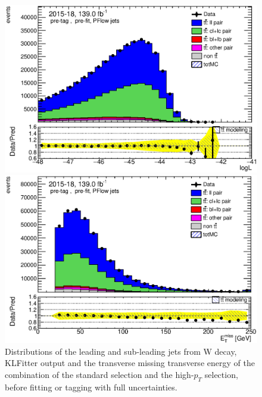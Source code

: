 \documentclass[letterpaper,12pt]{article}
\begin{document}
\begin{figure}[H]
\begin{minipage}[b]{.45\textwidth}
	\includegraphics[width=1\textwidth]{Oct_distributions/pretagNoRwDL1rwithhighpTPFlow_scaledall/DataMC_LLR.eps}
	\end{minipage}\hfill
	\begin{minipage}[b]{.45\textwidth}
	\centering
	\includegraphics[width=1\textwidth]{Oct_distributions/pretagNoRwDL1rwithhighpTPFlow_scaledall/DataMC_MET.eps}
	\end{minipage}
	\caption{Distributions of the leading and sub-leading jets from W decay, KLFitter output and the 
	transverse missing transverse energy of the combination of the standard selection and the 
	high-$p_T$ selection, before fitting or tagging with full uncertainties.} \label{fig:jets_PFlow}
	\end{figure}
	
	
	
\end{document}
